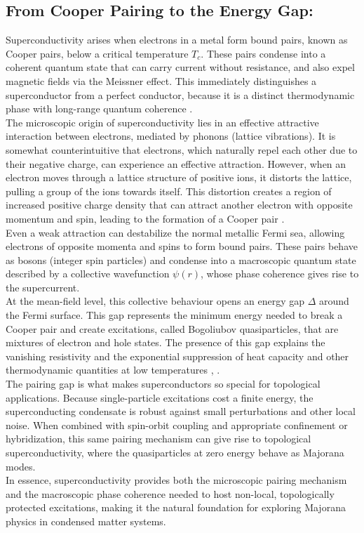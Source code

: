\documentclass[11pt, letterpaper, titlepage]{article}
\begin{document}
\subsection{From Cooper Pairing to the Energy Gap:} 
Superconductivity arises when electrons in a metal form bound pairs, known as Cooper pairs, below a critical temperature $T_c$. These pairs condense into a coherent quantum state that can carry current without resistance, and also expel magnetic fields via the Meissner effect. This immediately distinguishes a superconductor from a perfect conductor, because it is a distinct thermodynamic phase with long-range quantum coherence \cite{Cambridge_MBPhysics}.\\
The microscopic origin of superconductivity lies in an effective attractive interaction between electrons, mediated by phonons (lattice vibrations). It is somewhat counterintuitive that electrons, which naturally repel each other due to their negative charge, can experience an effective attraction. However, when an electron moves through a lattice structure of positive ions, it distorts the lattice, pulling a group of the ions towards itself. This distortion creates a region of increased positive charge density that can attract another electron with opposite momentum and spin, leading to the formation of a Cooper pair \cite{Physics_libretexts_2025}.\\
Even a weak attraction can destabilize the normal metallic Fermi sea, allowing electrons of opposite momenta and spins to form bound pairs. These pairs behave as bosons (integer spin particles) and condense into a macroscopic quantum state described by a collective wavefunction $ψ(r)$, whose phase coherence gives rise to the supercurrent.\\
At the mean-field level, this collective behaviour opens an energy gap $Δ$ around the Fermi surface. This gap represents the minimum energy needed to break a Cooper pair and create excitations, called Bogoliubov quasiparticles, that are mixtures of electron and hole states. The presence of this gap explains the vanishing resistivity and the exponential suppression of heat capacity and other thermodynamic quantities at low temperatures \cite{Cambridge_MBPhysics}, \cite{BCS}.\\
The pairing gap is what makes superconductors so special for topological applications. Because single-particle excitations cost a finite energy, the superconducting condensate is robust against small perturbations and other local noise. When combined with spin-orbit coupling and appropriate confinement or hybridization, this same pairing mechanism can give rise to topological superconductivity, where the quasiparticles at zero energy behave as Majorana modes.\\
In essence, superconductivity provides both the microscopic pairing mechanism and the macroscopic phase coherence needed to host non-local, topologically protected excitations, making it the natural foundation for exploring Majorana physics in condensed matter systems.
\end{document}
